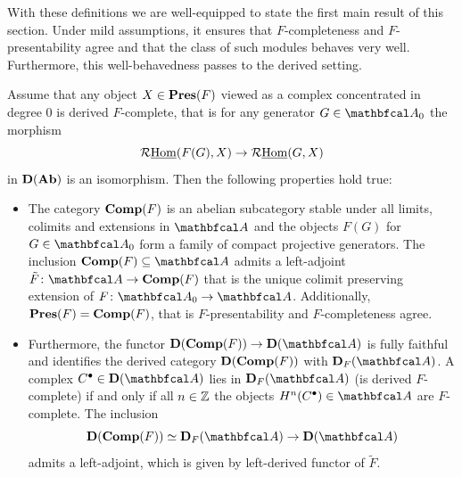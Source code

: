 With these definitions we are well-equipped to state the first main result of this section. Under mild assumptions, it ensures that $F$-completeness and $F$-presentability agree and that the class of such modules behaves very well. Furthermore, this well-behavedness passes to the derived setting.
\begin{lemma}
	\label{lemma: THE LEMMA}
	
	Assume that any object $X\in{{\mathbf{Pres}}(F)}$ viewed as a complex concentrated in degree $0$ is derived $F$-complete, that is for any generator $G\in\category A_0$ the morphism
	$$\mathcal{R}{\underline{\operatorname{Hom}}}(F(G), X) \to \mathcal{R}{\underline{\operatorname{Hom}}}(G, X)$$
	in ${{\mathbf{D}}({{\mathbf{Ab}}})}$ is an isomorphism. Then the following properties hold true:
	\begin{itemize}
		\item
		The category ${{\mathbf{Comp}}(F)}$ is an abelian subcategory stable under all limits, colimits and extensions in $\category A$ and the objects $F(G)$ for $G\in\category A_0$ form a family of compact projective generators. The inclusion $\completeMod F\subseteq \category A$ admits a left-adjoint $\tilde F\colon \category A\to\completeMod{F}$ that is the unique colimit preserving extension of $F\colon \category A_0\to \category A$. Additionally, ${{\mathbf{Pres}}(F)} = {{\mathbf{Comp}}(F)}$, that is $F$-presentability and $F$-completeness agree.
		
		\item
		Furthermore, the functor $\derived{\completeMod F}\to \derived{\category A}$ is fully faithful and identifies the derived category ${{\mathbf{D}}({{\mathbf{Comp}}(F)})}$ with $\categoryname{D}_F(\category A)$. A complex $C^\bullet\in\derived{\category A}$ lies in $\categoryname{D}_F(\category A)$ (\ie is derived $F$-complete) if and only if all $n\in {\mathbb{Z}}$ the objects $H^n(C^\bullet)\in\category A$ are $F$-complete. The inclusion
		$$\derived{\completeMod{F}}\equiv\categoryname{D}_F(\category A) \to\derived{\category A}$$
		admits a left-adjoint, which is given by left-derived functor of $\tilde F$.
	\end{itemize}
\end{lemma}
